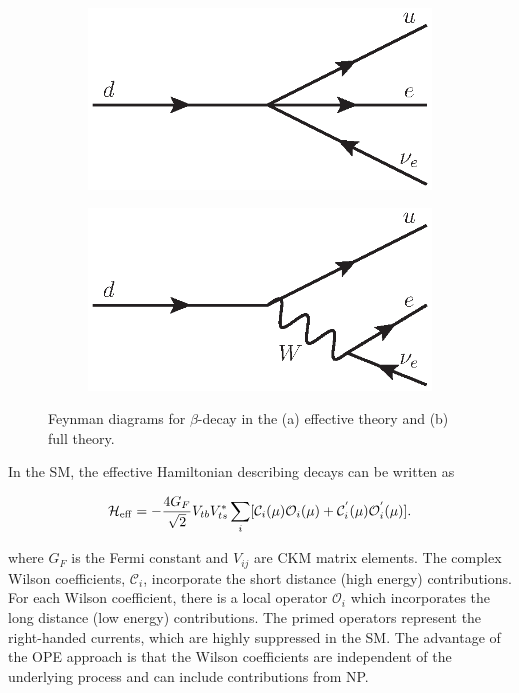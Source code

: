 \begin{figure}[!tb]
\centering
\begin{subfigure}{0.49\textwidth}
\includegraphics[width=\linewidth]{figs/theory/beta_4point.eps}
\caption{}
\label{fig:beta:a}
\end{subfigure}
\begin{subfigure}{0.49\textwidth}
\includegraphics[width=\linewidth]{figs/theory/beta_w.eps}
\caption{} 
\label{fig:beta:b}
\end{subfigure}
\caption{Feynman diagrams for $\beta$-decay in the (a) effective theory and (b) full theory.}
\label{fig:beta}
\end{figure}

In the SM, the effective Hamiltonian describing \btosll decays can be written as

\begin{equation}
\mathcal{H}_{\rm eff} = - \frac{4G_{F}}{\sqrt{2}}V_{tb}V^{*}_{ts}\sum_{i}[\mathcal{C}_{i}(\mu)\mathcal{O}_{i}(\mu) + \mathcal{C}^{'}_{i}(\mu)\mathcal{O}^{'}_{i}(\mu)].
\end{equation}

\noindent where $G_{F}$ is the Fermi constant and $V_{ij}$ are CKM matrix elements. The complex Wilson coefficients, $\mathcal{C}_{i}$, incorporate the short distance (high energy) contributions. For each Wilson coefficient, there is a local operator $\mathcal{O}_{i}$ which incorporates the long distance (low energy) contributions. The primed operators represent the right-handed currents, which are highly suppressed in the SM. The advantage of the OPE approach is that the Wilson coefficients are independent of the underlying process and can include contributions from NP. 


